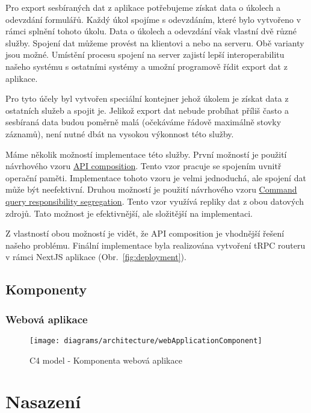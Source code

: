 Pro export sesbíraných dat z aplikace potřebujeme získat data o úkolech a odevzdání formulářů.
Každý úkol spojíme s odevzdáním, které bylo vytvořeno v rámci splnění tohoto úkolu.
Data o úkolech a odevzdání však vlastní dvě různé služby.
Spojení dat můžeme provést na klientovi a nebo na serveru.
Obě varianty jsou možné.
Umístění procesu spojení na server zajistí lepší interoperabilitu našeho systému s ostatními systémy a umožní programově řídit export dat z aplikace.

Pro tyto účely byl vytvořen speciální kontejner jehož úkolem je získat data z ostatních služeb a spojit je.
Jelikož export dat nebude probíhat příliš často a sesbíraná data budou poměrně malá (očekáváme řádově maximálně stovky záznamů), není nutné dbát na vysokou výkonnost této služby.

Máme několik možností implementace této služby.
První možností je použití návrhového vzoru \href{https://microservices.io/patterns/data/api-composition.html}{API composition}.
Tento vzor pracuje se spojením uvnitř operační paměti.
Implementace tohoto vzoru je velmi jednoduchá, ale spojení dat může být neefektivní.
Druhou možností je použití návrhového vzoru \href{https://microservices.io/patterns/data/cqrs.html}{Command query responsibility segregation}.
Tento vzor využívá repliky dat z obou datových zdrojů.
Tato možnost je efektivnější, ale složitější na implementaci.

Z vlastností obou možností je vidět, že API composition je vhodnější řešení našeho problému.
Finální implementace byla realizována vytvoření tRPC routeru v rámci NextJS aplikace (Obr.~\ref{fig:deployment}).

\subsection{Komponenty}\label{subsec:komponenty}

\subsubsection{Webová aplikace}

\begin{figure}[H]
    \texttt{[image: diagrams/architecture/webApplicationComponent]}
    \caption{C4 model - Komponenta webová aplikace}\label{fig:architecture-component-web-application}
\end{figure}

\section{Nasazení}\label{sec:deployment}

